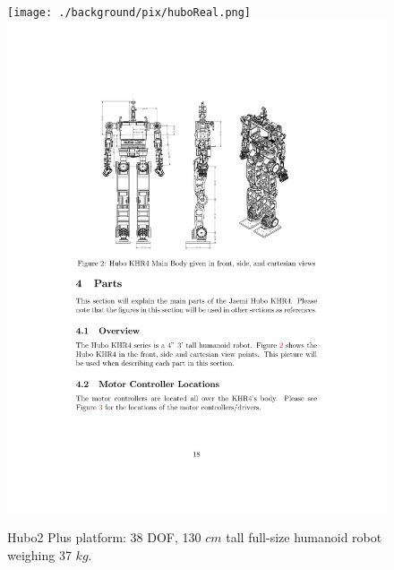 \begin{figure}[thpb]
  \centering
\texttt{[image: ./background/pix/huboReal.png]}\includegraphics[width=0.63\columnwidth]{./pix/huboSkel.pdf}
  \caption{Hubo2 Plus platform: 38 DOF, 130 $cm$ tall full-size humanoid robot weighing 37 $kg$.}
  \label{fig:hubo}
\end{figure}



